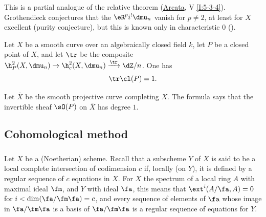This is a partial analogue of the relative theorem
(\hyperref[I]{Arcata}, V \ref{I:5-3-4}). Grothendieck conjectures
that the $\eR^p i^! \dmu_n$ vanish for $p\ne 2$, at least for $X$ excellent
(purity conjecture), but this is known only in characteristic $0$
(\cite[XIX]{sga4}).






\begin{theorem}\label{IV:2-1-5}
Let $X$ be a smooth curve over an algebraically closed field $k$, let $P$ be a
closed point of $X$, and let $\tr$ be the composite
$\h_P^2(X,\dmu_n) \to \h_c^2(X,\dmu_n) \xrightarrow{\tr} \dZ/n$. One has
\[
  \tr \cl(P) = 1 \text{.}
\]
\end{theorem}

Let $\bar X$ be the smooth projective curve completing $X$. The formula says
that the invertible sheaf $\sO(P)$ on $\bar X$ has degree $1$.











\subsection{Cohomological method}\label{IV:2-2}






\subsubsection{}\label{IV:2-2-1}

Let $X$ be a (Noetherian) scheme. Recall that a subscheme $Y$ of $X$ is said
to be a local complete intersection of codimension $c$ if, locally (on $Y$),
it is defined by a regular sequence of $c$ equations in $X$. For $X$ the
spectrum of a local ring $A$ with maximal ideal $\fm$, and $Y$ with ideal
$\fa$, this means that $\ext^i(A/\fa,A) = 0$ for
$i<\dim(\fa/\fm\fa)=c$, and every sequence of elements of $\fa$ whose image
in $\fa/\fm\fa$ is a basis of $\fa/\fm\fa$ is a regular sequence of
equations for $Y$.






\subsubsection{}\label{IV:2-2-2}

